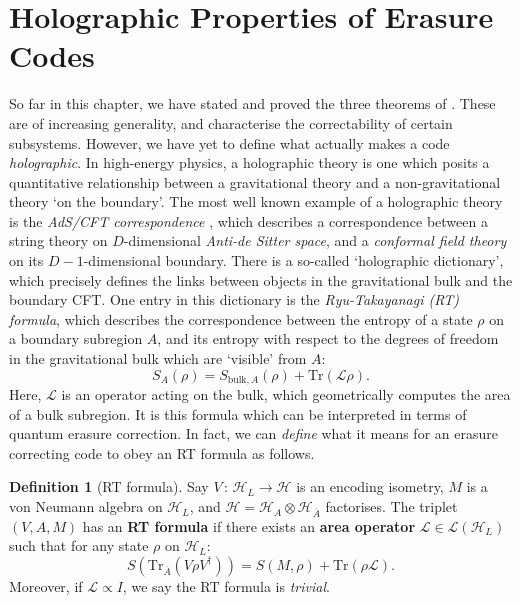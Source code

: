\documentclass[12pt,a4paper]{report}
\numberwithin{equation}{section}
\newcommand{\ol}[1]{\overline{#1}}
\newcommand{\tr}{\text{Tr}}
\theoremstyle{definition}
\newtheorem{definition}{Definition}[section]
\theoremstyle{theorem}
\theoremstyle{theorem}
\theoremstyle{example}
\theoremstyle{definition}
\begin{document}
\section{Holographic Properties of Erasure Codes}
So far in this chapter, we have stated and proved the three theorems of \cite{Harlow}. These are of increasing generality, and characterise the correctability of certain subsystems. However, we have yet to define what actually makes a code \textit{holographic}. In high-energy physics, a holographic theory is one which posits a quantitative relationship between a gravitational theory and a non-gravitational theory `on the boundary'. The most well known example of a holographic theory is the \textit{AdS/CFT correspondence} \cite{Maldacena}, which describes a correspondence between a string theory on $D$-dimensional \textit{Anti-de Sitter space}, and a \textit{conformal field theory} on its $D-1$-dimensional boundary. There is a so-called `holographic dictionary', which precisely defines the links between objects in the gravitational bulk and the boundary CFT. One entry in this dictionary is the \textit{Ryu-Takayanagi (RT) formula}, which describes the correspondence between the entropy of a state $\rho$ on a boundary subregion $A$, and its entropy with respect to the degrees of freedom in the gravitational bulk which are `visible' from $A$:
\begin{equation}\label{RTreal}
	S_{A}(\rho)=S_{\text{bulk},A}(\rho)+\tr(\mathcal{L}\rho).
\end{equation}
Here, $\mathcal{L}$ is an operator acting on the bulk, which geometrically computes the area of a bulk subregion. It is this formula which can be interpreted in terms of quantum erasure correction. In fact, we can \textit{define} what it means for an erasure correcting code to obey an RT formula as follows.
\begin{definition}[RT formula]
	Say $V\,:\,\mathcal{H}_{L}\to\mathcal{H}$ is an encoding isometry, $M$ is a von Neumann algebra on $\mathcal{H}_{L}$, and $\mathcal{H}=\mathcal{H}_{A}\otimes\mathcal{H}_{\ol{A}}$ factorises. The triplet $(V,A,M)$ has an \textbf{RT formula} if there exists an \textbf{area operator} $\mathcal{L}\in\mathcal{L}(\mathcal{H}_{L})$ such that for any state $\rho$ on $\mathcal{H}_{L}$:
	\begin{equation}\label{RT3}
		S(\tr_{\ol{A}}(V\rho V^{\dagger}))=S(M,\rho)+\tr(\rho\mathcal{L}).
	\end{equation}
	Moreover, if $\mathcal{L}\propto I$, we say the RT formula is \textit{trivial}.
\end{definition}
\end{document}
